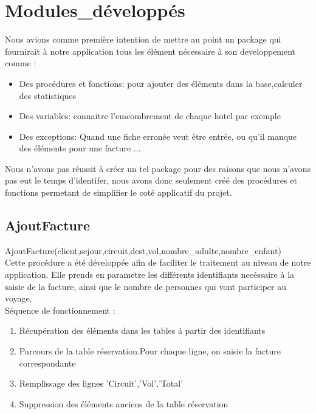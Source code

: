 \section{Modules\_d\'evelopp\'es}
Nous avions comme premi\`ere intention de mettre au point un package qui fournirait \`a notre application tous les \'el\'ement n\'ecessaire \`a son developpement comme :

\begin{itemize}
\item Des proc\'edures et fonctions: pour ajouter des \'el\'ements dans la base,calculer des statistiques
\item Des variables: connaitre l'emcombrement de chaque hotel par exemple
\item Des exceptions: Quand une fiche erron\'ee veut \^etre entr\'ee, ou qu'il manque des \'el\'ements pour une facture ...
\end{itemize}

Nous n'avons pas r\'eussit \`a cr\'eer un tel package pour des raisons que nous n'avons pas eut le temps d'identifer, nous avons donc seulement cr\'e\'e des proc\'edures et fonctions permetant de simplifier le cot\'e applicatif du projet.

\subsection{AjoutFacture}

AjoutFacture(client,sejour,circuit,dest,vol,nombre\_adulte,nombre\_enfant)\\
Cette proc\'edure a \'et\'e d\'evelopp\'ee afin de faciliter le traitement au niveau de notre application.
Elle prends en parametre les diff\'erents identifiants nec\'essaire \`a la saisie de la facture, ainsi que le nombre de personnes qui vont participer au voyage.\\

Séquence de fonctionnement :
\begin{enumerate}[1]
\item R\'ecup\'eration des \'el\'ements dans les tables \'a partir des identifiants
\item Parcours de la table r\'eservation.Pour chaque ligne, on saisie la facture correspondante
\item Remplissage des lignes 'Circuit','Vol','Total'
\item Suppression des \'el\'ements anciens de la table r\'eservation

\end{enumerate}

